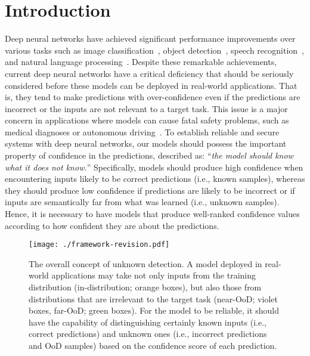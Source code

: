 \documentclass[preprint,12pt]{elsarticle}
\begin{document}
\section{Introduction} \label{sec:introduction}
Deep neural networks have achieved significant performance improvements over various tasks such as image classification~\citep{krizhevsky2012imagenet, rawat2017deep}, object detection~\citep{ren2015fastrcnn, zhao2019object}, speech recognition~\citep{hinton2012deep, nassif2019speech}, and natural language processing~\citep{mikolov2010recurrent, devlin2019bert}. Despite these remarkable achievements, current deep neural networks have a critical deficiency that should be seriously considered before these models can be deployed in real-world applications. That is, they tend to make predictions with over-confidence even if the predictions are incorrect or the inputs are not relevant to a target task. This issue is a major concern in applications where models can cause fatal safety problems, such as medical diagnoses or autonomous driving~\citep{mehrtash2020medical, mohseni2020autonomous}. To establish reliable and secure systems with deep neural networks, our models should possess the important property of confidence in the predictions, described as: ``\emph{the model should know what it does not know.}'' Specifically, models should produce high confidence when encountering inputs likely to be correct predictions (i.e., known samples), whereas they should produce low confidence if predictions are likely to be incorrect or if inputs are semantically far from what was learned (i.e., unknown samples). Hence, it is necessary to have models that produce well-ranked confidence values according to how confident they are about the predictions. 

\begin{figure*}[!t]
\vskip 0.1in
    \centering
    \texttt{[image: ./framework-revision.pdf]}
    \caption{The overall concept of unknown detection. A model deployed in real-world applications may take not only inputs from the training distribution (in-distribution; orange boxes), but also those from distributions that are irrelevant to the target task (near-OoD; violet boxes, far-OoD; green boxes). For the model to be reliable, it should have the capability of distinguishing certainly known inputs (i.e., correct predictions) and unknown ones (i.e., incorrect predictions and OoD samples) based on the confidence score of each prediction.}
    \label{fig:concept}
\vskip -0.1in
\end{figure*}
\end{document}
